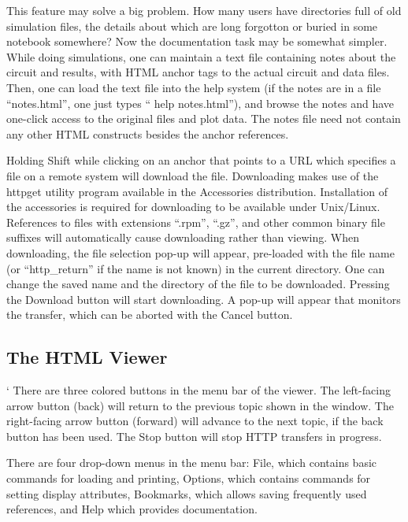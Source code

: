 This feature may solve a big problem.  How many {\WRspice} users have
directories full of old simulation files, the details about which are
long forgotton or buried in some notebook somewhere?  Now the
documentation task may be somewhat simpler.  While doing simulations,
one can maintain a text file containing notes about the circuit and
results, with HTML anchor tags to the actual circuit and data files. 
Then, one can load the text file into the {\WRspice} help system (if
the notes are in a file ``{\vt notes.html}'', one just types ``{\vt
help notes.html}''), and browse the notes and have one-click access to
the original files and plot data.  The notes file need not contain any
other HTML constructs besides the anchor references.

Holding {\kb Shift} while clicking on an anchor that points to a URL
which specifies a file on a remote system will download the file. 
Downloading makes use of the {\vt httpget} utility program available
in the Accessories distribution.  Installation of the accessories is
required for downloading to be available under Unix/Linux.  References
to files with extensions ``{\vt .rpm}'', ``{\vt .gz}'', and other
common binary file suffixes will automatically cause downloading
rather than viewing.  When downloading, the file selection pop-up will
appear, pre-loaded with the file name (or ``{\vt http\_return}'' if
the name is not known) in the current directory.  One can change the
saved name and the directory of the file to be downloaded.  Pressing
the {\cb Download} button will start downloading.  A pop-up will
appear that monitors the transfer, which can be aborted with the {\cb
Cancel} button.

\subsection{The HTML Viewer}
`
There are three colored buttons in the menu bar of the viewer.  The
left-facing arrow button (back) will return to the previous topic
shown in the window.  The right-facing arrow button (forward) will
advance to the next topic, if the back button has been used.  The {\cb
Stop} button will stop HTTP transfers in progress.

There are four drop-down menus in the menu bar:  {\cb File}, which
contains basic commands for loading and printing, {\cb Options}, which
contains commands for setting display attributes, {\cb Bookmarks},
which allows saving frequently used references, and {\cb Help} which
provides documentation.

